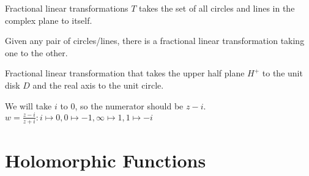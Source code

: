 \documentclass[a4paper,12pt]{article}
\begin{document}
Fractional linear transformations $T$ takes the set of all circles and lines in the complex plane to itself. 

Given any pair of circles/lines, there is a fractional linear transformation taking one to the other.


\begin{example}
    Fractional linear transformation that takes the upper half plane $H^+$ to the unit disk $D$ and the real axis to the unit circle.

    We will take $i$ to $0$, so the numerator should be $z-i$. $w=\frac{z-i}{z+i}:i\mapsto0,0\mapsto-1,\infty\mapsto1,1\mapsto-i$
\end{example}

\section{Holomorphic Functions}
\end{document}
